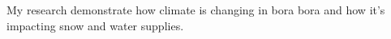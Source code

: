 My research demonstrate how climate is changing in bora bora and how it's impacting snow and water supplies.